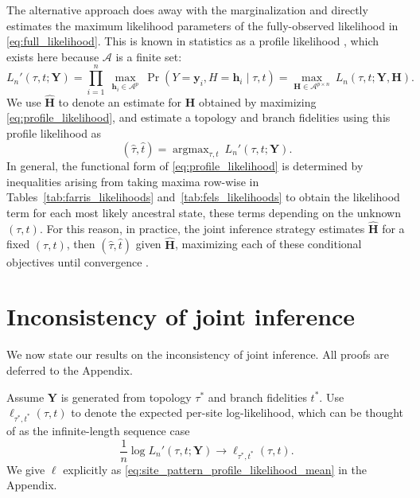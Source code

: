 \documentclass[11pt]{article}
\newcommand{\alphabet}{\mathcal{A}}
\newcommand{\fullAlignment}{\mathbf{Y}}
\newcommand{\alignmentColumn}{\mathbf{y}}
\newcommand{\alignmentColumnRV}{Y}
\newcommand{\fullAncestralStates}{\mathbf{H}}
\newcommand{\ancestralStateColumn}{\mathbf{h}}
\newcommand{\ancestralStateColumnRV}{H}
\newcommand{\nCols}{n}
\newcommand{\nAncestralStateRows}{p}
\DeclareMathOperator*{\argmax}{argmax}
\begin{document}
The alternative approach \citep{Sagulenko2017-jo} does away with the marginalization and directly estimates the maximum likelihood parameters of the fully-observed likelihood in \eqref{eq:full_likelihood}.
This is known in statistics as a profile likelihood \citep{Murphy2000-ry}, which exists here because $\alphabet$ is a finite set:
\begin{equation}
\label{eq:profile_likelihood}
L_\nCols'(\tau, t; \fullAlignment) = \prod_{i=1}^{\nCols} \ \max_{\ancestralStateColumn_i\in\alphabet^{\nAncestralStateRows}} \ \Pr(\alignmentColumnRV=\alignmentColumn_i, \ancestralStateColumnRV=\ancestralStateColumn_i \mid \tau, t) = \max_{\fullAncestralStates\in\alphabet^{\nAncestralStateRows\times\nCols}} \ L_\nCols(\tau, t; \fullAlignment, \fullAncestralStates).
\end{equation}
We use $\hat{\fullAncestralStates}$ to denote an estimate for $\fullAncestralStates$ obtained by maximizing \eqref{eq:profile_likelihood}, and estimate a topology and branch fidelities using this profile likelihood as
\begin{equation}
\label{eq:profile_likelihood_topology_bl}
(\hat{\tau}, \hat{t}) = \argmax_{\tau, t} \ L_\nCols'(\tau, t; \fullAlignment).
\end{equation}
In general, the functional form of \eqref{eq:profile_likelihood} is determined by inequalities arising from taking maxima row-wise in Tables~\ref{tab:farris_likelihoods} and~\ref{tab:fels_likelihoods} to obtain the likelihood term for each most likely ancestral state, these terms depending on the unknown $(\tau, t)$.
For this reason, in practice, the joint inference strategy estimates $\hat{\fullAncestralStates}$ for a fixed $(\tau,t)$, then $(\hat{\tau},\hat{t})$ given $\hat{\fullAncestralStates}$, maximizing each of these conditional objectives until convergence \citep{Sagulenko2017-jo}.


\section*{Inconsistency of joint inference}

We now state our results on the inconsistency of joint inference.
All proofs are deferred to the Appendix.

Assume $\fullAlignment$ is generated from topology $\tau^*$ and branch fidelities $t^*$.
Use $\ell_{\tau^*,t^*}(\tau, t)$ to denote the expected per-site log-likelihood, which can be thought of as the infinite-length sequence case
\[
\frac{1}{n}\log L_\nCols'(\tau, t; \fullAlignment) \rightarrow \ell_{\tau^*,t^*}(\tau, t).
\]
We give $\ell$ explicitly as \eqref{eq:site_pattern_profile_likelihood_mean} in the Appendix.
\end{document}
